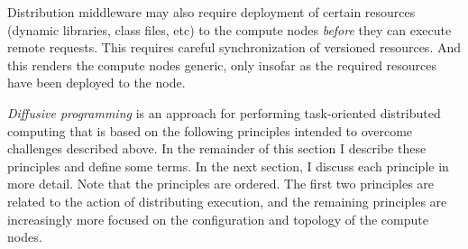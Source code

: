 \documentclass[11pt]{article}
\begin{document}
Distribution middleware may also require deployment of certain resources (dynamic libraries, class files, etc) to the compute nodes \emph{before} they can execute remote requests. This requires careful synchronization of versioned resources. And this renders the compute nodes generic, only insofar as the required resources have been deployed to the node.

\emph{Diffusive programming} is an approach for performing task-oriented distributed computing that is based on the following principles intended to overcome challenges described above. In the remainder of this section I describe these principles and define some terms. In the next section, I discuss each principle in more detail. Note that the principles are ordered. The first two principles are related to the action of distributing execution, and the remaining principles are increasingly more focused on the configuration and topology of the compute nodes.
\end{document}
